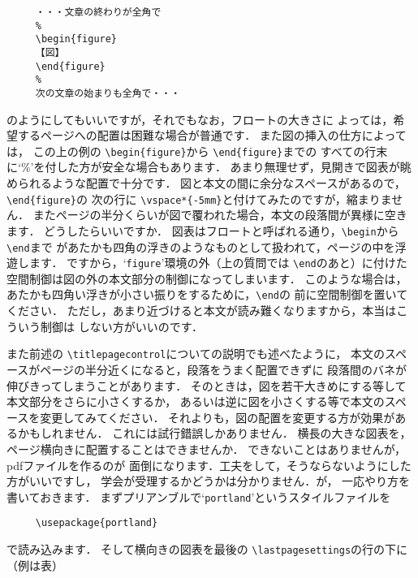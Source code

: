 \documentclass[onecolumn]{jsce}  %
\begin{document}
\begin{Enumerate}
\renewcommand{\baselinestretch}{.74}
\begin{verbatim}
     ・・・文章の終わりが全角で
     %
     \begin{figure}
     【図】
     \end{figure}
     %
     次の文章の始まりも全角で・・・
\end{verbatim}
\renewcommand{\baselinestretch}{1}
のようにしてもいいですが，それでもなお，フロートの大きさに
よっては，希望するページへの配置は困難な場合が普通です．
また図の挿入の仕方によっては，
この上の例の \verb+\begin{figure}+から \verb+\end{figure}+までの
すべての行末に`\%'を付した方が安全な場合もあります．
あまり無理せず，見開きで図表が眺められるような配置で十分です．
%
\Qitem 図と本文の間に余分なスペースがあるので，\verb+\end{figure}+の
次の行に \verb+\vspace*{-5mm}+と付けてみたのですが，縮まりません．
またページの半分くらいが図で覆われた場合，本文の段落間が異様に空きます．
どうしたらいいですか．
\Aitem 図表はフロートと呼ばれる通り，\verb+\begin+から \verb+\end+まで
があたかも四角の浮きのようなものとして扱われて，ページの中を浮遊します．
ですから，`{\tt figure}'環境の外（上の質問では \verb+\end+のあと）に付けた
空間制御は図の外の本文部分の制御になってしまいます．
このような場合は，あたかも四角い浮きが小さい振りをするために，\verb+\end+の
前に空間制御を置いてください．
ただし，あまり近づけると本文が読み難くなりますから，本当はこういう制御は
しない方がいいのです．

また前述の \verb+\titlepagecontrol+についての説明でも述べたように，
本文のスペースがページの半分近くになると，段落をうまく配置できずに
段落間のバネが伸びきってしまうことがあります．
そのときは，図を若干大きめにする等して本文部分をさらに小さくするか，
あるいは逆に図を小さくする等で本文のスペースを変更してみてください．
それよりも，図の配置を変更する方が効果があるかもしれません．
これには試行錯誤しかありません．
%
\Qitem 横長の大きな図表を，ページ横向きに配置することはできませんか．
\Aitem できないことはありませんが，pdfファイルを作るのが
面倒になります．工夫をして，そうならないようにした方がいいですし，
学会が受理するかどうかは分かりません．が，
一応やり方を書いておきます．
まずプリアンブルで`{\tt portland}'というスタイルファイルを
\begin{verbatim}
     \usepackage{portland}
\end{verbatim}
で読み込みます．
そして横向きの図表を最後の \verb+\lastpagesettings+の行の下に
（例は表）


\end{Enumerate}
\end{document}
